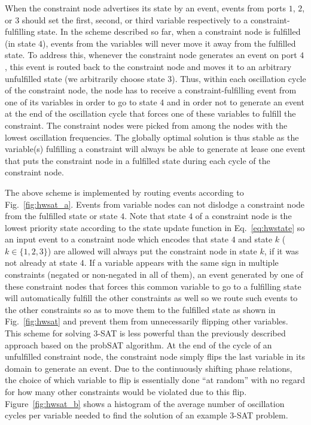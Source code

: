 \documentclass[10pt]{article}
\begin{document}
When the constraint node advertises its state by an event, events from ports $1$, $2$, or $3$ should set the first, second, or third variable respectively to a constraint-fulfilling state. In the scheme described so far, when a constraint node is fulfilled (in state $4$), events from the variables will never move it away from the fulfilled state. To address this, whenever the constraint node generates an event on port $4$, this event is routed back to the constraint node and moves it to an arbitrary unfulfilled state (we arbitrarily choose state $3$). Thus, within each oscillation cycle of the constraint node, the node has to receive a constraint-fulfilling event from one of its variables in order to go to state $4$ and in order not to generate an event at the end of the oscillation cycle that forces one of these variables to fulfill the constraint. The constraint nodes were picked from among the nodes with the lowest oscillation frequencies. The globally optimal solution is thus stable as the variable(s) fulfilling a constraint will always be able to generate at lease one event that puts the constraint node in a fulfilled state during each cycle of the constraint node.

The above scheme is implemented by routing events according to Fig.~\ref{fig:hwsat_a}. Events from variable nodes can not dislodge a constraint node from the fulfilled state or state $4$. Note that state $4$ of a constraint node is the lowest priority state according to the state update function in Eq.~\ref{eq:hwstate} so an input event to a constraint node which encodes that state $4$ and state $k$ ($k \in \{1,2,3\}$) are allowed will always put the constraint node in state $k$, if it was not already at state $4$. If a variable appears with the same sign in multiple constraints (negated or non-negated in all of them), an event generated by one of these constraint nodes that forces this common variable to go to a fulfilling state will automatically fulfill the other constraints as well so we route such events to the other constraints so as to move them to the fulfilled state as shown in Fig.~\ref{fig:hwsat} and prevent them from unnecessarily flipping other variables. This scheme for solving 3-SAT is less powerful than the previously described approach based on the probSAT algorithm. At the end of the cycle of an unfulfilled constraint node, the constraint node simply flips the last variable in its domain to generate an event. Due to the continuously shifting phase relations, the choice of which variable to flip is essentially done ``at random''  with no regard for how many other constraints would be violated due to this flip. Figure~\ref{fig:hwsat_b} shows a histogram of the average number of oscillation cycles per variable needed to find the solution of an example 3-SAT problem. 
\end{document}
